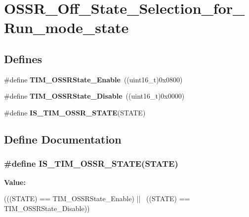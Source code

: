 \hypertarget{group__OSSR__Off__State__Selection__for__Run__mode__state}{
\section{OSSR\_\-Off\_\-State\_\-Selection\_\-for\_\-Run\_\-mode\_\-state}
\label{group__OSSR__Off__State__Selection__for__Run__mode__state}
}
\subsection*{Defines}
\begin{DoxyCompactItemize}
\item 
\hypertarget{group__OSSR__Off__State__Selection__for__Run__mode__state_ga3703ba6189db045bec48c864289f997e}{
\#define {\bfseries TIM\_\-OSSRState\_\-Enable}~((uint16\_\-t)0x0800)}
\label{group__OSSR__Off__State__Selection__for__Run__mode__state_ga3703ba6189db045bec48c864289f997e}

\item 
\hypertarget{group__OSSR__Off__State__Selection__for__Run__mode__state_ga766dfd8b3c32ec1b8b446f0e2dbe7b97}{
\#define {\bfseries TIM\_\-OSSRState\_\-Disable}~((uint16\_\-t)0x0000)}
\label{group__OSSR__Off__State__Selection__for__Run__mode__state_ga766dfd8b3c32ec1b8b446f0e2dbe7b97}

\item 
\#define {\bfseries IS\_\-TIM\_\-OSSR\_\-STATE}(STATE)
\end{DoxyCompactItemize}


\subsection{Define Documentation}
\hypertarget{group__OSSR__Off__State__Selection__for__Run__mode__state_ga48b4f15f6346e28087edbb9af2ba4f63}{
\subsubsection[{IS\_\-TIM\_\-OSSR\_\-STATE}]{\setlength{\rightskip}{0pt plus 5cm}\#define IS\_\-TIM\_\-OSSR\_\-STATE(STATE)}}
\label{group__OSSR__Off__State__Selection__for__Run__mode__state_ga48b4f15f6346e28087edbb9af2ba4f63}
{\bfseries Value:}
\begin{DoxyCode}
(((STATE) == TIM_OSSRState_Enable) || \
                                  ((STATE) == TIM_OSSRState_Disable))
\end{DoxyCode}
